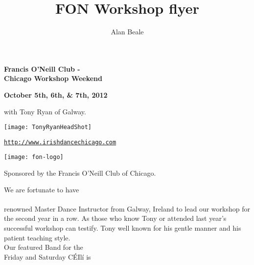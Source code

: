 \documentclass[12pt,
notumble,
letterpaper]{leaflet}
\title{FON Workshop flyer}
\author{Alan Beale}
\date{}
\begin{document}
\begin{center}
{\Large\textbf{Francis O'Neill Club - \\ Chicago Workshop Weekend}}\\ 
\end{center}

\begin{center}
\textbf{October 5th, 6th, \&  7th, 2012} 


\vspace*{0.25em}
with Tony Ryan of Galway.
\end{center}

\vspace*{0.45em}
\begin{center}
\texttt{[image: TonyRyanHeadShot]}
\end{center}

\begin{center}
\vspace*{2em}
{\normalsize \href{http://www.irishdancechicago.com}{\tt http://www.irishdancechicago.com} }

\vspace*{0.45em}
\begin{center}
\texttt{[image: fon-logo]}
\end{center}


{\small Sponsored by the Francis O'Neill Club of Chicago.}
\end{center}


\pagebreak
\begin{center}
We are fortunate to have \\
\\
\vspace*{1em}renowned Master Dance Instructor from Galway, Ireland to
lead our workshop for the second year in a row. As those who know
Tony or attended last year's successful workshop can testify. Tony well
known for his gentle manner and his patient teaching style. \\

\vspace*{4em}
Our featured Band for the \\Friday and Saturday C\'{E}Il\'{i} is \\
\end{center}
\pagebreak
\end{document}
